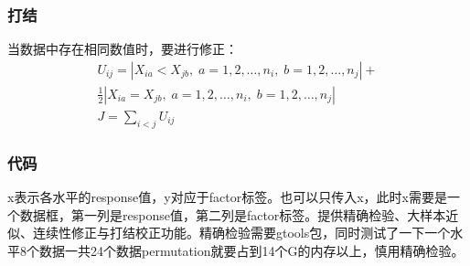 \subsubsection{打结}
当数据中存在相同数值时，要进行修正：
\begin{gather*}
	U_{ij}=\left|X_{ia}<X_{jb},\;a=1,2,\dots,n_i,\;b=1,2,\dots,n_j\right|+ \\
	\frac{1}{2}\left|X_{ia}=X_{jb},\;a=1,2,\dots,n_i,\;b=1,2,\dots,n_j\right| \\
	J=\sum_{i<j}U_{ij}
\end{gather*}
\subsubsection{代码}
x表示各水平的response值，y对应于factor标签。也可以只传入x，此时x需要是一个数据框，第一列是response值，第二列是factor标签。提供精确检验、大样本近似、连续性修正与打结校正功能。精确检验需要gtools包，同时测试了一下一个水平8个数据一共24个数据permutation就要占到14个G的内存以上，慎用精确检验。
\inputminted[bgcolor=white, linenos, frame=single, numbersep=5pt, breaklines]{r}{nonparametric-statistics/chapter3/jt.R}